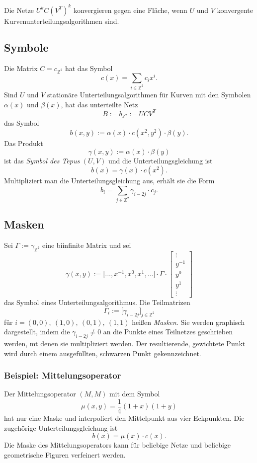 Die Netze \(U^kC(V^T)^k\) konvergieren gegen eine Fläche, wenn \(U\) und \(V\) konvergente Kurvenunterteilungsalgorithmen sind.


\subsection{Symbole}
Die Matrix \(C=c_{\mathbb{Z}^2}\) hat das Symbol
\[c(x) = \sum_{i \in \mathbb{Z}^2} c_i x^i.\]
Sind \(U\) und \(V\) stationäre Unterteilungsalgorithmen für Kurven mit den Symbolen \(\alpha(x)\) und \(\beta(x)\), hat das unterteilte Netz
\[B := b_{\mathbb{Z}^2} := UCV^T\]
das Symbol
\[b(x,y) := \alpha(x) \cdot c(x^2,y^2) \cdot \beta(y).\]
Das Produkt
\[\gamma(x,y) := \alpha(x) \cdot \beta(y)\]
ist das \textit{Symbol des Tepus} \((U,V)\) und die Unterteilungsgleichung ist
\[b(x) = \gamma(x) \cdot c(x^2).\]
Multipliziert man die Unterteilungsgleichung aus, erhält sie die Form
\[b_i = \sum_{j \in \mathbb{Z}^2} \gamma_{i-2j} \cdot c_j.\]


\subsection{Masken}
Sei \(\Gamma := \gamma_{\mathbb{Z}^2}\) eine biinfinite Matrix und sei
\[\gamma(x,y) := \lbrack ...,x^{-1},x^0,x^1,...\rbrack \cdot \Gamma \cdot \begin{bmatrix} \vdots \\ y^{-1} \\ y^0 \\ y^1 \\ \vdots \end{bmatrix}\]
das Symbol eines Unterteilungsalgorithmus. Die Teilmatrizen
\[\Gamma_i := \lbrack \gamma_{i-2j} \rbrack_{j \in \mathbb{Z}^2}\]
für \(i=(0,0),~(1,0),~(0,1),~(1,1)\) heißen \textit{Masken}. Sie werden graphisch dargestellt, indem die \(\gamma_{i-2j} \ne 0\) an die Punkte eines Teilnetzes geschrieben werden, mt denen sie multipliziert werden. Der resultierende, gewichtete Punkt wird durch einem ausgefüllten, schwarzen Punkt gekennzeichnet.

\subsubsection{Beispiel: Mittelungsoperator}
Der Mittelungsoperator \((M,M)\) mit dem Symbol
\[\mu(x,y)= \frac{1}{4}(1+x)(1+y)\]
hat nur eine Maske und interpoliert den Mittelpunkt aus vier Eckpunkten. Die zugehörige Unterteilungsgleichung ist
\[b(x) = \mu(x) \cdot c(x).\]
Die Maske des Mittelungsoperators kann für beliebige Netze und beliebige geometrische Figuren verfeinert werden.


